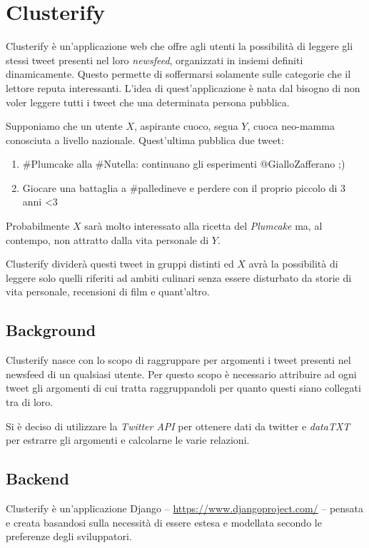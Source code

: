 \chapter{Clusterify}
	Clusterify è un'applicazione web che offre agli utenti la possibilità di leggere gli stessi tweet presenti nel loro \emph{newsfeed}, organizzati in insiemi definiti dinamicamente. Questo permette di soffermarsi solamente sulle categorie che il lettore reputa interessanti. L'idea di quest'applicazione è nata dal bisogno di non voler leggere tutti i tweet che una determinata persona pubblica. 

	Supponiamo che un utente $X$, aspirante cuoco, segua $Y$, cuoca neo-mamma conosciuta a livello nazionale. Quest'ultima pubblica due tweet:
	\begin{enumerate}
		\item \#Plumcake alla \#Nutella: continuano gli esperimenti @GialloZafferano ;)
		\item Giocare una battaglia a \#palledineve e perdere con il proprio piccolo di 3 anni <3
	\end{enumerate}
	Probabilmente $X$ sarà molto interessato alla ricetta del \emph{Plumcake} ma, al contempo, non attratto dalla vita personale di $Y$.

	Clusterify dividerà questi tweet in gruppi distinti ed $X$ avrà la possibilità di leggere solo quelli riferiti ad ambiti culinari senza essere disturbato da storie di vita personale, recensioni di film e quant'altro.

\section{Background}
	Clusterify nasce con lo scopo di raggruppare per argomenti i tweet presenti nel newsfeed di un qualsiasi utente. Per questo scopo è necessario attribuire ad ogni tweet gli argomenti di cui tratta raggruppandoli per quanto questi siano collegati tra di loro. 

	Si è deciso di utilizzare la \emph{Twitter API} per ottenere dati da twitter e \emph{dataTXT} per estrarre gli argomenti e calcolarne le varie relazioni.

	
	

\section{Backend}
	Clusterify è un'applicazione Django -- \url{https://www.djangoproject.com/} -- pensata e creata basandosi sulla necessità di essere estesa e modellata secondo le preferenze degli sviluppatori. %

